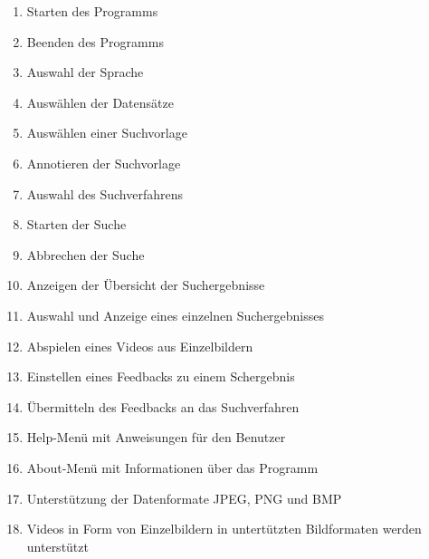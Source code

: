 \begin{enumerate} [label=\bfseries /F \arabic*0/]
	\subsection{Pflicht}
	\item Starten des Programms
	\item Beenden des Programms
	\item Auswahl der Sprache
	\item Ausw\"ahlen der Datens\"atze
	\item Ausw\"ahlen einer Suchvorlage
	\item Annotieren der Suchvorlage
	\item Auswahl des Suchverfahrens
	\item Starten der Suche
	\item Abbrechen der Suche
	\item Anzeigen der \"Ubersicht der Suchergebnisse
	\item Auswahl und Anzeige eines einzelnen Suchergebnisses
	\item Abspielen eines Videos aus Einzelbildern
	\item Einstellen eines Feedbacks zu einem Schergebnis
	\item \"Ubermitteln des Feedbacks an das Suchverfahren
	\item Help-Menü mit Anweisungen für den Benutzer
	\item About-Menü mit Informationen über das Programm
	\item Unterstützung der Datenformate JPEG, PNG und BMP
	\item Videos in Form von Einzelbildern in untert\"utzten Bildformaten werden unterst\"utzt

\end{enumerate}
